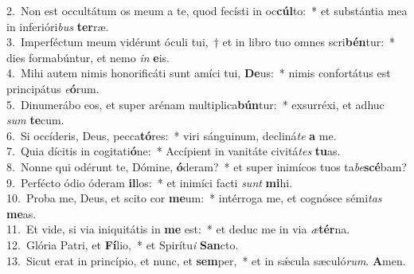 {2.~}Non est occultátum os meum a te, quod fecísti in oc\textbf{cúl}to:~* et substántia mea in inferióri\textit{bus} \textbf{ter}ræ.\\
{3.~}Imperféctum meum vidérunt óculi tui,~† et in libro tuo omnes scri\textbf{bén}tur:~* dies formabúntur, et nemo \textit{in} \textbf{e}is.\\
{4.~}Mihi autem nimis honorificáti sunt amíci tui, \textbf{De}us:~* nimis confortátus est principátus \textit{e}\textbf{ó}rum.\\
{5.~}Dinumerábo eos, et super arénam multiplica\textbf{bún}tur:~* exsurréxi, et adhuc \textit{sum} \textbf{te}cum.\\
{6.~}Si occíderis, Deus, pecca\textbf{tó}res:~* viri sánguinum, decliná\textit{te} \textbf{a} me.\\
{7.~}Quia dícitis in cogitati\textbf{ó}ne:~* Accípient in vanitáte civitá\textit{tes} \textbf{tu}as.\\
{8.~}Nonne qui odérunt te, Dómine, \textbf{ó}deram?~* et super inimícos tuos ta\textit{be}\textbf{scé}bam?\\
{9.~}Perfécto ódio óderam \textbf{il}los:~* et inimíci facti \textit{sunt} \textbf{mi}hi.\\
{10.~}Proba me, Deus, et scito cor \textbf{me}um:~* intérroga me, et cognósce sémi\textit{tas} \textbf{me}as.\\
{11.~}Et vide, si via iniquitátis in \textbf{me} est:~* et deduc me in via \textit{æ}\textbf{tér}na.\\
{12.~}Glória Patri, et \textbf{Fí}lio,~* et Spirítu\textit{i} \textbf{San}cto.\\
{13.~}Sicut erat in princípio, et nunc, et \textbf{sem}per,~* et in sǽcula sæculó\textit{rum}. \textbf{A}men.\\

